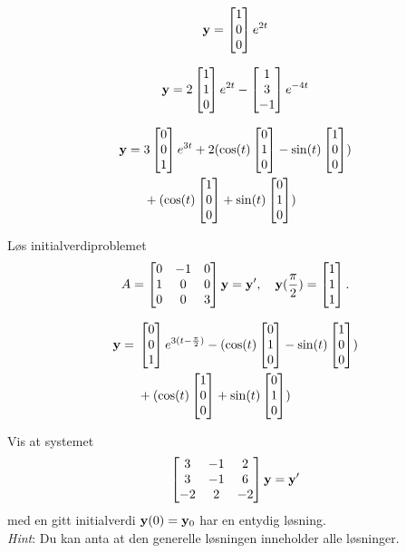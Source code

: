 \begin{losning}


\begin{punkt}
	$$\mathbf{y}=\begin{bmatrix} 1 \\ 0 \\ 0 \end{bmatrix}e^{2t}$$
\end{punkt}

\begin{punkt}
	$$\mathbf{y}=2\begin{bmatrix} 1 \\ 1 \\ 0 \end{bmatrix}e^{2t}-\begin{bmatrix} 1 \\ 3 \\ -1 \end{bmatrix}e^{-4t}$$
\end{punkt}

\begin{punkt}
	$$	\begin{aligned}
	\mathbf{y}= {} & 3\begin{bmatrix} 0 \\ 0 \\ 1 \end{bmatrix}e^{3t}+2(\cos (t) \begin{bmatrix} 0 \\ 1 \\ 0 \end{bmatrix}-\sin (t) \begin{bmatrix} 1 \\ 0 \\ 0 \end{bmatrix})\\
	& +(\cos (t) \begin{bmatrix} 1 \\ 0 \\ 0 \end{bmatrix}+\sin (t) \begin{bmatrix} 0 \\ 1 \\ 0 \end{bmatrix})
	\end{aligned}$$
	
\end{punkt}


	

\end{losning}

\begin{oppgave}
Løs initialverdiproblemet $$
A=
\begin{bmatrix}
0 & -1 & 0\\
1 & 0 & 0\\
0 & 0 & 3
\end{bmatrix}
\mathbf{y}=\mathbf{y}',\quad \mathbf{y}(\frac{\pi}{2})=\begin{bmatrix} 1 \\ 1 \\ 1 \end{bmatrix}.
$$
\end{oppgave}

\begin{losning}
	$$	\begin{aligned}
	\mathbf{y}= {} & \begin{bmatrix} 0 \\ 0 \\ 1 \end{bmatrix}e^{3(t-\frac{\pi}{2})}-(\cos (t) \begin{bmatrix} 0 \\ 1 \\ 0 \end{bmatrix}-\sin (t) \begin{bmatrix} 1 \\ 0 \\ 0 \end{bmatrix})\\
	& +(\cos (t) \begin{bmatrix} 1 \\ 0 \\ 0 \end{bmatrix}+\sin (t) \begin{bmatrix} 0 \\ 1 \\ 0 \end{bmatrix})
	\end{aligned}$$
\end{losning}


\begin{oppgave}
Vis at systemet
$$
\begin{bmatrix}
3 & -1 & 2\\
3 & -1 & 6\\
-2 & 2 & -2
\end{bmatrix} \mathbf{y}= \mathbf{y} '$$
med en gitt initialverdi $\mathbf{y}(0)=\mathbf{y}_0$ har en entydig løsning.\\

\noindent
\emph{Hint}: Du kan anta at den generelle løsningen inneholder alle løsninger.
\end{oppgave}


